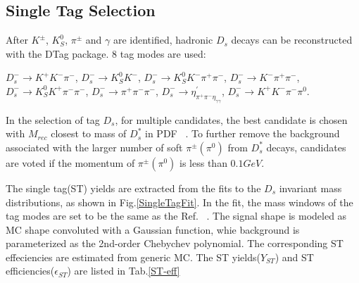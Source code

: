 \subsection{Single Tag Selection}
\par{
After $K^{\pm}$, $K_S^{0}$, $\pi^{\pm}$ and $\gamma$ are identified, hadronic $D_{s}$ decays can be reconstructed with the DTag package. 8 tag modes are used:

$D_{s}^{-} \rightarrow K^{+}K^{-}\pi^{-}$, $D_{s}^{-} \rightarrow K_{S}^{0}K^{-}$, $D_{s}^{-} \rightarrow K_{S}^{0}K^{-}\pi^{+}\pi^{-}$, $D_{s}^{-} \rightarrow K^{-}\pi^{+}\pi^{-}$, $D_{s}^{-} \rightarrow K_{S}^{0}K^{+}\pi^{-}\pi^{-}$, $D_{s}^{-} \rightarrow \pi^{+}\pi^{-}\pi^{-}$, $D_{s}^{-} \rightarrow \eta^{'}_{\pi^{+}\pi^{-}\eta_{\gamma\gamma}}$, $D_{s}^{-} \rightarrow K^{+}K^{-}\pi^{-}\pi^{0}$.

In the selection of tag $D_{s}$, for multiple candidates, the best candidate is chosen with $M_{rec}$ closest to mass of $D_{s}^{*}$ in PDF ~\cite{PDG2018}.
To further remove the background associated with the larger number of soft $\pi^{\pm}(\pi^{0})$ from $D_{s}^{*}$ decays, candidates are voted if the momentum of $\pi^{\pm}(\pi^{0})$ is less than $0.1GeV$.

The single tag(ST) yields are extracted from the fits to the $D_{s}$ invariant mass distributions, as shown in Fig.\ref{SingleTagFit}. In the fit, the mass windows of the tag modes are set to be the same as the Ref. ~\cite{Doc-DB-630-v35}.
The signal shape is modeled as MC shape convoluted with a Gaussian function, whie background is parameterized as the 2nd-order Chebychev polynomial.
The corresponding ST effeciencies are estimated from generic MC. The ST yields($Y_{ST}$) and ST efficiencies($\epsilon_{ST}$) are listed in Tab.\ref{ST-eff}

}
